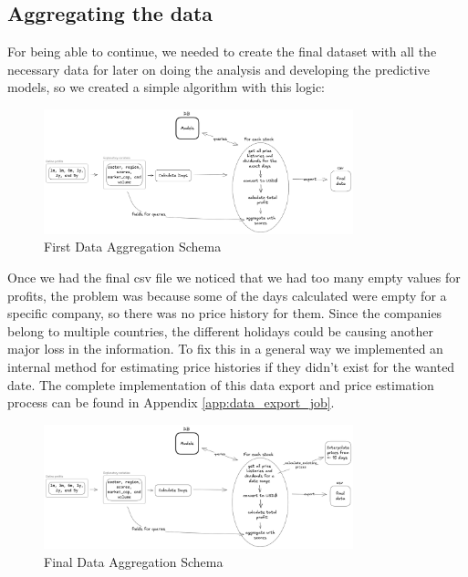 \documentclass[11pt,english,a4paper,hidelinks]{book}
\begin{document}
\subsection{Aggregating the data}

For being able to continue, we needed to create the final dataset with all the necessary data for later on doing the analysis and developing the predictive models, so we created a simple algorithm with this logic:

\begin{figure}[H]
    \centering
    \includegraphics[width=0.8\textwidth]{images/tweenvest/First Data Aggregation Schema.png}
    \caption{First Data Aggregation Schema}
    \label{fig:first_data_aggregation_schema}
\end{figure}

\noindent Once we had the final csv file we noticed that we had too many empty values for profits, the problem was because some of the days calculated were empty for a specific company, so there was no price history for them. Since the companies belong to multiple countries, the different holidays could be causing another major loss in the information. To fix this in a general way we implemented an internal method for estimating price histories if they didn't exist for the wanted date. The complete implementation of this data export and price estimation process can be found in Appendix \ref{app:data_export_job}.

\begin{figure}[H]
    \centering
    \includegraphics[width=0.8\textwidth]{images/tweenvest/Final Data Aggregation Schema.png}
    \caption{Final Data Aggregation Schema}
    \label{fig:final_data_aggregation_schema}
\end{figure}
\end{document}
